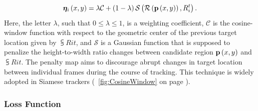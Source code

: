 \begin{equation}
    {\bm{\eta}_{i}} \left( x, y \right) =
    \lambda \mathcal{C} +
    \left( {1 - \lambda} \right) {\mathcal{S}} \left( 
        {\mathcal{R}} \left( 
            {\mathbf{p}} \left( x, y \right)
         \right),
        {R}_{i}^{t}
     \right).
\end{equation}
Here, the letter $\lambda$, such that $0 \leq \lambda \leq 1$, is a weighting coefficient, $\mathcal{C}$ is the cosine-window function with respect to the geometric center of the previous target location given by $\subsup{R}{i}{t}$, and $\mathcal{S}$ is a Gaussian function that is supposed to penalize the height-to-width ratio changes between candidate region ${\mathbf{p}} \left( x, y \right)$ and $\subsup{R}{i}{t}$. The penalty map aims to discourage abrupt changes in target location between individual frames during the course of tracking. This technique is widely adopted in Siamese trackers (\figtext{}~\ref{fig:CosineWindow} on page \pageref{fig:CosineWindow}).

\subsubsection{Loss Function}

